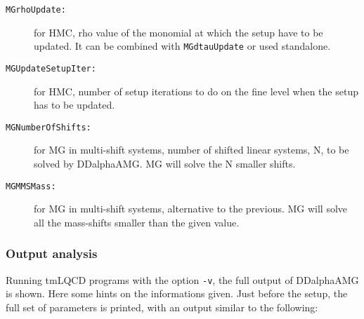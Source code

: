 \begin{description}
	\item[\texttt{MGrhoUpdate:}] for HMC, rho value of the monomial at which the setup have to be updated. It can be combined with \texttt{MGdtauUpdate} or used standalone.
	\item[\texttt{MGUpdateSetupIter:}] for HMC, number of setup iterations to do on the fine level when the setup has to be updated.
	\item[\texttt{MGNumberOfShifts:}] for MG in multi-shift systems, number of shifted linear systems, N, to be solved by DDalphaAMG. MG will solve the N smaller shifts.
	\item[\texttt{MGMMSMass:}] for MG in multi-shift systems, alternative to the previous. MG will solve all the mass-shifts smaller than the given value.
\end{description}
\subsubsection{Output analysis\label{sec:DDalphaAMG_output}}
Running tmLQCD programs with the option \texttt{-v}, the full output of DDalphaAMG is shown. Here some hints on the informations given. Just before the setup, the full set of parameters is printed, with an output similar to the following:
